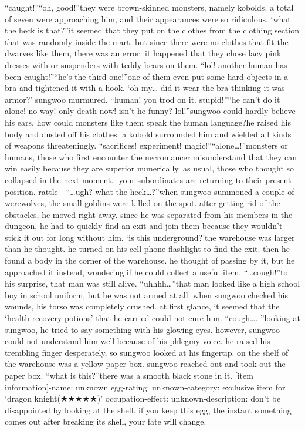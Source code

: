 “caught!”“oh, good!”they were brown-skinned monsters, namely kobolds.
 a total of seven were approaching him, and their appearances were so ridiculous.
‘what the heck is that?”it seemed that they put on the clothes from the clothing section that was randomly inside the mart.
 but since there were no clothes that fit the dwarves like them, there was an error.
it happened that they chose lacy pink dresses with or suspenders with teddy bears on them.
“lol! another human has been caught!”“he’s the third one!”one of them even put some hard objects in a bra and tightened it with a hook.
‘oh my… did it wear the bra thinking it was armor?’ sungwoo murmured.
“human! you trod on it.
 stupid!”“he can’t do it alone! no way! only death now! isn’t he funny? lol!”sungwoo could hardly believe his ears.
 how could monsters like them speak the human language?he raised his body and dusted off his clothes.
 a kobold surrounded him and wielded all kinds of weapons threateningly.
“sacrifices! experiment! magic!”“alone…!”monsters or humans, those who first encounter the necromancer misunderstand that they can win easily because they are superior numerically.
as usual, those who thought so collapsed in the next moment.
-your subordinates are returning to their present position.
rattle—“…ugh? what the heck…?”when sungwoo summoned a couple of werewolves, the small goblins were killed on the spot.
 after getting rid of the obstacles, he moved right away.
 since he was separated from his members in the dungeon, he had to quickly find an exit and join them because they wouldn’t stick it out for long without him.
‘is this underground?’the warehouse was larger than he thought.
 he turned on his cell phone flashlight to find the exit.
 then he found a body in the corner of the warehouse.
 he thought of passing by it, but he approached it instead, wondering if he could collect a useful item.
“…cough!”to his surprise, that man was still alive.
“uhhhh…”that man looked like a high school boy in school uniform, but he was not armed at all.
when sungwoo checked his wounds, his torso was completely crushed.
 at first glance, it seemed that the ‘health recovery potions’ that he carried could not cure him.
“cough….
”looking at sungwoo, he tried to say something with his glowing eyes.
 however, sungwoo could not understand him well because of his phlegmy voice.
 he raised his trembling finger desperately, so sungwoo looked at his fingertip.
 on the shelf of the warehouse was a yellow paper box.
 sungwoo reached out and took out the paper box.
“what is this?”there was a smooth black stone in it.
[item information]-name: unknown egg-rating: unknown-category: exclusive item for ‘dragon knight(★★★★★)’ occupation-effect: unknown-description: don’t be disappointed by looking at the shell.
 if you keep this egg, the instant something comes out after breaking its shell, your fate will change.



